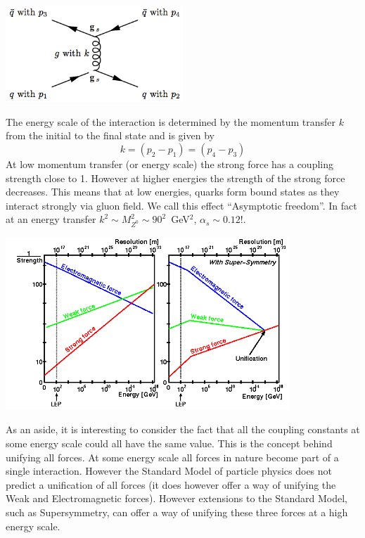 \begin{center}
\includegraphics[width=0.5\textwidth]{fig/strongforce/strong_mom_transf.png}
\end{center}
The energy scale of the interaction is determined by the momentum transfer $k$ from the initial to the final state and is given by
\[
k=(p_2-p_1)=(p_4-p_3)
\]
At low momentum transfer (or energy scale) the strong force has a coupling strength close to 1. However at higher energies the strength of the strong force decreases. This means that at low energies, quarks form bound states as they interact strongly via gluon field. We call this effect ``Asymptotic freedom''. In fact at an energy transfer $k^2\sim M_{Z^0}^2\sim 90^2$~GeV$^2$, $\alpha_s\sim0.12$!.
\begin{center}
\includegraphics[width=0.8\textwidth]{fig/strongforce/running_coupling.png}
\end{center}
As an aside, it is interesting to consider the fact that all the coupling constants at some energy scale could all have the same value. This is the concept behind unifying all forces. At some energy scale all forces in nature become part of a single interaction. However the Standard Model of particle physics does not predict a unification of all forces (it does however offer a way of unifying the Weak and Electromagnetic forces). However extensions to the Standard Model, such as Supersymmetry, can offer a way of unifying these three forces at a high energy scale.



